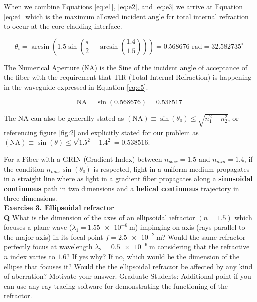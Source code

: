\documentclass[main.tex]{subfiles}
\begin{document}
When we combine Equations \ref{eq:e1}, \ref{eq:e2}, and \ref{eq:e3} we arrive at Equation \ref{eq:e4} which is the maximum allowed incident angle for total internal refraction to occur at the core cladding interface.

\begin{equation}\label{eq:e4}
\theta_i = \arcsin(1.5\sin(\frac{\pi}{2} - \arcsin(\frac{1.4}{1.5}))) = 0.568676 \text{ rad} = 32.582735^{\circ}
\end{equation}

The Numerical Aperture (NA) is the Sine of the incident angle of acceptance of the fiber with the requirement that TIR (Total Internal Refraction) is happening in the waveguide expressed in Equation \ref{eq:e5}. 

\begin{equation}\label{eq:e5}
\text{NA} = \sin(0.568676) = 0.538517
\end{equation}

The NA can also be generally stated as $(\text{NA}) \equiv \sin(\theta_0) \leq \sqrt{n_1^2 - n_2^2}$, or referencing figure \ref{fig:2} and explicitly stated for our problem as $(\text{NA}) \equiv \sin(\theta) \leq \sqrt{1.5^2 - 1.4^2} = 0.538516 $. 

For a Fiber with a GRIN (Gradient Index) between $n_{max} = 1.5$ and $n_{min} = 1.4$, if the condition $n_{max}\sin(\theta_0)$ is respected, light in a uniform medium propagates in a straight line where as light in a gradient fiber propagates along a \textbf{sinusoidal continuous} path in two dimensions and a \textbf{helical continuous} trajectory in three dimensions.\\

\textbf{Exercise 3. Ellipsoidal refractor}\\
\textbf{Q} What is the dimension of the axes of an ellipsoidal refractor $(n=1.5)$ which focuses a plane wave ($\lambda_1 = \SI{1.55e-6}{\meter}$) impinging on axis (rays parallel to the major axis) in its focal point $f =  \SI{2.5e-2}{\meter}$? Would the same refractor perfectly focus at wavelength $\lambda_2 = \SI{0.5e-6}{\meter}$ considering that the refractive $n$ index varies to $1.6$? If yes why? If no, which would be the dimension of the ellipse that focuses it? Would the the ellipsoidal refractor be affected by any kind of aberration? Motivate your answer. Graduate Students: Additional point if you can use any ray tracing software for demonstrating the functioning of the refractor.\\
\end{document}
